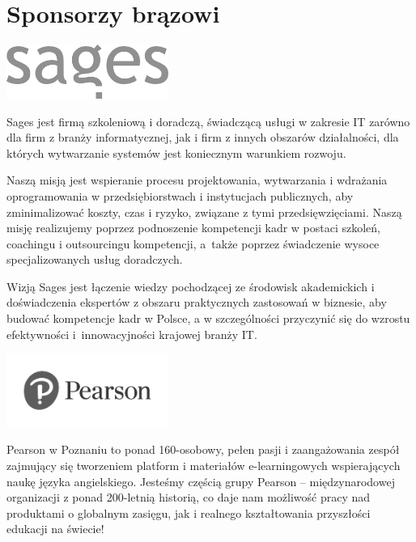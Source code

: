\documentclass[11pt,twoside,b5paper]{book}
\begin{document}
\newpage
\section*{Sponsorzy brązowi}

\begin{minipage}[t]{0.915\textwidth}
  \begin{center}
    \includegraphics[width=200px]{img/logos.bw/sages.png} 
  \end{center}
\end{minipage}

Sages jest firmą szkoleniową i doradczą, świadczącą usługi w zakresie IT zarówno dla firm z branży informatycznej, jak i firm z innych obszarów działalności, dla których wytwarzanie systemów jest koniecznym warunkiem rozwoju.

Naszą misją jest wspieranie procesu projektowania, wytwarzania i wdrażania oprogramowania w przedsiębiorstwach i instytucjach publicznych, aby zminimalizować koszty, czas i ryzyko, związane z tymi przedsięwzięciami. Naszą misję realizujemy poprzez podnoszenie kompetencji kadr w postaci szkoleń, coachingu i outsourcingu kompetencji, a~także poprzez świadczenie wysoce specjalizowanych usług doradczych.

Wizją Sages jest łączenie wiedzy pochodzącej ze środowisk akademickich i doświadczenia ekspertów z obszaru praktycznych zastosowań w biznesie, aby budować kompetencje kadr w Polsce, a w szczególności przyczynić się do wzrostu efektywności i~innowacyjności krajowej branży IT.

\begin{minipage}[t]{0.915\textwidth}
  \begin{center}
    \includegraphics[width=200px]{img/logos.bw/person.png} 
  \end{center}
\end{minipage}

Pearson w Poznaniu to ponad 160-osobowy, pełen pasji i zaangażowania zespół zajmujący się tworzeniem platform i materiałów e-learningowych wspierających naukę języka angielskiego. Jesteśmy częścią grupy Pearson – międzynarodowej organizacji z ponad 200-letnią historią, co daje nam możliwość pracy nad produktami o globalnym zasięgu, jak i realnego kształtowania przyszłości edukacji na świecie!
\end{document}
